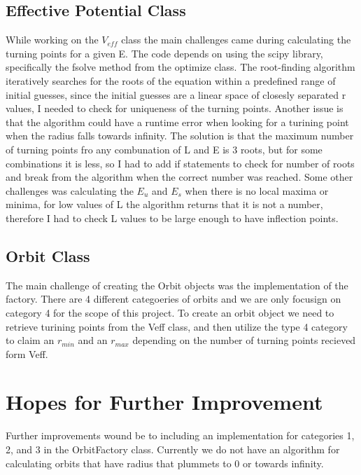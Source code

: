 \documentclass{article}
\begin{document}
\subsection{Effective Potential Class}
While working on the $V_{eff}$ class the main challenges came during calculating the turning points for a given E. The code depends on using the scipy library, specifically the fsolve method from the optimize class. The root-finding algorithm iteratively searches for the roots of the equation within a predefined range of initial guesses, since the initial guesses are a linear space of closesly separated r values, I needed to check for uniqueness of the turning points. Another issue is that the algorithm could have a runtime error when looking for a turining point when the radius falls towards infinity. The solution is that the maximum number of turning points fro any combunation of L and E is 3 roots, but for some combinations it is less, so I had to add if statements to check for number of roots and break from the algorithm when the correct number was reached. Some other challenges was calculating the $E_u$ and $E_s$ when there is no local maxima or minima, for low values of L the algorithm returns that it is not a number, therefore I had to check L values to be large enough to have inflection points.

\subsection{Orbit Class}
The main challenge of creating the Orbit objects was the implementation of the factory. There are 4 different categoeries of orbits and we are only focusign on category 4 for the scope of this project. To create an orbit object we need to retrieve turining points from the Veff class, and then utilize the type 4 category to claim an $r_{min}$ and an $r_{max}$ depending on the number of turning points recieved form Veff.


\section{Hopes for Further Improvement}

Further improvements wound be to including an implementation for categories 1, 2, and 3 in the OrbitFactory class. Currently we do not have an algorithm for calculating orbits that have radius that plummets to 0 or towards infinity.
\end{document}
